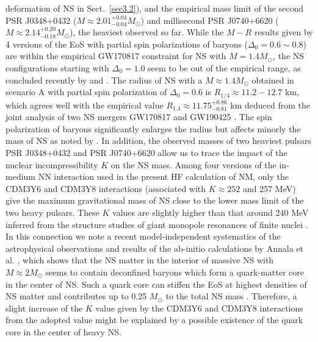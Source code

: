deformation of \gls{NS} in Sect.~\ref{sec3.2}), and the empirical mass limit of the second 
\gls{PSR} J0348+0432 ($M\approx 2.01^{+0.04}_{-0.04}M_\odot$) and millisecond 
\gls{PSR} J0740+6620 ($M\approx 2.14^{+0.20}_{-0.18}M_\odot$), the heaviest  
observed so far. While the $M-R$ results given by 4 versions of the EoS with partial spin
polarizations of baryons ($\Delta_0 = 0.6\sim 0.8$) are within the empirical 
GW170817 constraint for \gls{NS} with $M=1.4M_\odot$, the \gls{NS} configurations starting with 
$\Delta_0 = 1.0$ seem to be out of the empirical range, as concluded recently 
by \cite{tan2020spin} and \cite{tews2020spin}. The radius of \gls{NS} with a 
$M\approx 1.4M_\odot$ obtained in scenario A with partial spin polarization 
of $\Delta_0 = 0.6$ is $R_{1/4}\approx 11.2 - 12.7$ km, which agrees well
with the empirical value $R_{1.4} \approx 11.75^{+0.86}_{-0.81}$ km deduced from 
the joint analysis of two \gls{NS} mergers GW170817 and GW190425 \citep{dietrich2020multimessenger}.
The spin polarization of baryons significantly enlarges the radius but affects minorly 
the mass of \gls{NS} as noted by \cite{tan2020spin}. In addition, the observed masses of two 
heaviest pulsars \gls{PSR} J0348+0432 and \gls{PSR} J0740+6620 allow us to trace the impact 
of the nuclear incompressibility $K$ on the \gls{NS} mass. Among four versions of the in-medium 
NN interaction used in the present HF calculation of NM, only the CDM3Y6 
and CDM3Y8 interactions (associated with $K\approx 252$ and 257 MeV) give the maximum 
gravitational mass of \gls{NS} close to the lower mass limit of the two heavy pulsars. These 
$K$ values are slightly higher than that around 240 MeV inferred from the structure studies 
of giant monopole resonances of finite nuclei \cite{garg2018compression}. In this connection we note 
a recent model-independent systematics of the astrophysical observations and results of the
ab-initio calculations by Annala et al. \cite{annala2020evidence}, which shows that the \gls{NS} 
matter in the interior of massive \gls{NS} with $M\approx 2M_\odot$ seems to contain deconfined 
baryons which form a quark-matter core in the center of \gls{NS}. Such a quark core can stiffen 
the EoS at highest densities of \gls{NS} matter and contributes up to 0.25 $M_\odot$ to the 
total \gls{NS} mass  \cite{annala2020evidence}. Therefore, a slight increase of the $K$ value given 
by the CDM3Y6 and CDM3Y8 interactions from the adopted value might be explained 
by a possible existence of the quark core in the center of heavy \gls{NS}.  

